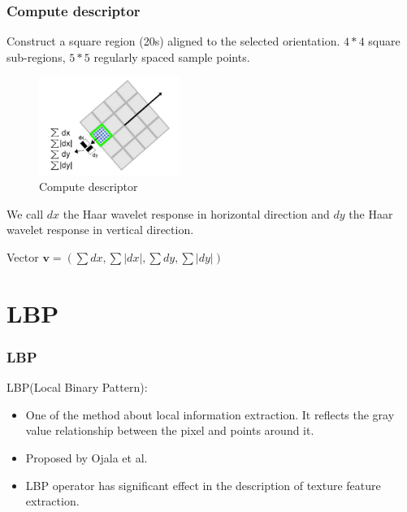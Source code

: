 \documentclass[notheorems, serif, table, compress]{beamer}  %
\begin{document}
\begin{frame}[fragile]
\frametitle{Compute descriptor}%


Construct a square region (20s) aligned to the selected orientation. $4*4$ square sub-regions, $5*5$ regularly spaced sample points.


\begin{figure}[!ht]
  \centering\includegraphics[width=1.8in]{descriptorsurf.png}
  \caption{Compute descriptor}
 \label{step}
  \end{figure}

We call $dx$ the Haar wavelet response in horizontal direction and $dy$ the Haar wavelet response in vertical direction.

Vector $\textbf{v}=(\sum dx, \sum \left|dx\right|, \sum dy, \sum \left|dy\right|)$
\end{frame}

\section{LBP}
\begin{frame}[fragile]
\frametitle{LBP}

LBP(Local Binary Pattern):

\begin{itemize}
\item One of the method about local information extraction. It reflects the gray value relationship between the pixel and points around it.%

\item Proposed by Ojala et al.

\item LBP operator has significant effect in the description of texture feature extraction.%
\end{itemize}
\end{frame}
\end{document}
